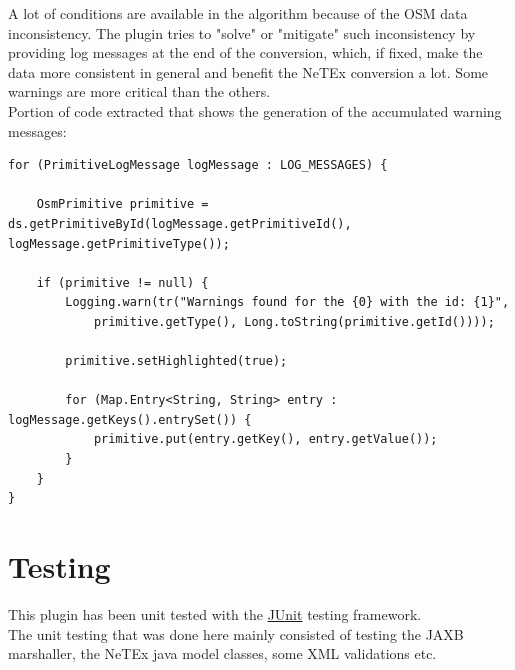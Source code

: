 A lot of conditions are available in the algorithm because of the OSM data inconsistency. The plugin tries to "solve" or "mitigate" such inconsistency by providing log messages at the end of the conversion, which, if fixed, make the data more consistent in general and benefit the NeTEx conversion a lot. Some warnings are more critical than the others.\\
\newpage
Portion of code extracted that shows the generation of the accumulated warning messages:
\begin{verbatim}
for (PrimitiveLogMessage logMessage : LOG_MESSAGES) {

	OsmPrimitive primitive = ds.getPrimitiveById(logMessage.getPrimitiveId(), logMessage.getPrimitiveType());

	if (primitive != null) {
		Logging.warn(tr("Warnings found for the {0} with the id: {1}",
			primitive.getType(), Long.toString(primitive.getId())));

		primitive.setHighlighted(true);

		for (Map.Entry<String, String> entry : logMessage.getKeys().entrySet()) {
			primitive.put(entry.getKey(), entry.getValue());
		}
	}
}
\end{verbatim}
\newpage
\section{Testing}
This plugin has been unit tested with the \href{https://junit.org/junit5/}{JUnit} testing framework.\\
The unit testing that was done here mainly consisted of testing the JAXB marshaller, the NeTEx java model classes, some XML validations etc.

